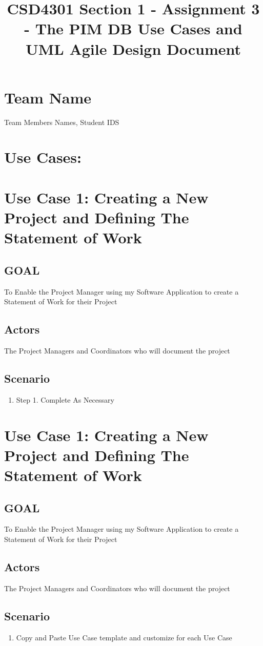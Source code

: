 \documentclass[10 pm]{article}
\title  {CSD4301 Section 1 - Assignment 3 - The PIM DB Use Cases and UML Agile Design Document }
\begin{document}
\maketitle

\section * {Team Name}
Team Members Names, Student IDS

\section * {Use Cases:}

\section * {Use Case 1: Creating a New Project and Defining The Statement of Work}
\subsection {GOAL}
To Enable the Project Manager using my Software Application to 
create a Statement of Work for their Project
\subsection {Actors}
The Project Managers and Coordinators who will document the project
\subsection {Scenario}

\begin{enumerate}
\item Step 1. Complete As Necessary
\end{enumerate}

\section * {Use Case 1: Creating a New Project and Defining The Statement of Work}
\subsection {GOAL}
To Enable the Project Manager using my Software Application to 
create a Statement of Work for their Project
\subsection {Actors}
The Project Managers and Coordinators who will document the project
\subsection {Scenario}

\begin{enumerate}
\item Copy and Paste Use Case template and customize for each Use Case
\end{enumerate}
\end{document}
